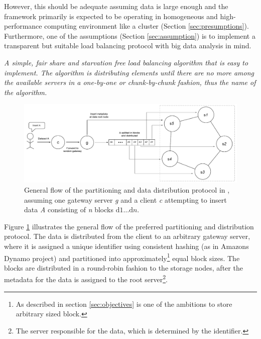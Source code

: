 However, this should be adequate assuming data is large enough and the framework primarily is expected to be operating in homogeneous and high-performance computing environment like a cluster (Section \ref{sec:presumptions}). Furthermore, one of the assumptions (Section \ref{sec:assumption}) is to implement a transparent but suitable load balancing protocol with big data analysis in mind.
\vspace*{3mm}

\begin{definition} \label{def:rr}
\textit{A simple, fair share and starvation free load balancing algorithm that is easy to implement. The algorithm is distributing elements until there are no more among the available servers in a one-by-one or chunk-by-chunk fashion, thus the name of the algorithm.}
\end{definition}
\vspace*{3mm}

\begin{figure}[h!]
	\centering
	\includegraphics[scale=0.5]{pdf/rr-partitioning.pdf}
	\caption[Overview of the partitioning and data distribution protocol]{General flow of the partitioning and data distribution protocol in \CodeName, assuming one gateway server \textit{g} and a client \textit{c} attempting to insert data \textit{A} consisting of \textit{n} blocks $\text{d}1 \ldots \text{d}n$.\label{fig:rr-partitioning}}
\end{figure}

Figure \ref{fig:rr-partitioning} illustrates the general flow of the preferred partitioning and distribution protocol. The data is distributed from the client to an arbitrary gateway server, where it is assigned a unique identifier using consistent hashing (as in Amazons Dynamo project) and partitioned into approximately\footnote{As described in section \ref{sec:objectives} is one of the ambitions to store arbitrary sized block.} equal block sizes. The blocks are distributed in a round-robin fashion to the storage nodes, after the metadata for the data is assigned to the root server\footnote{The server responsible for the data, which is determined by the identifier.}.

